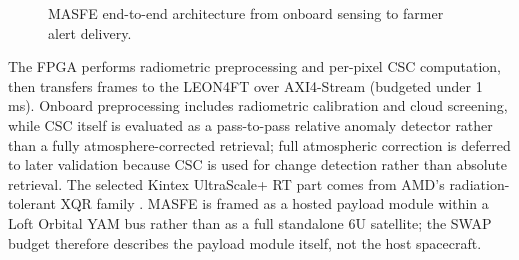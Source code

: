 \documentclass[11pt,letterpaper]{article}
\begin{document}
\begin{figure}[!htbp]
\centering
{}
\caption{MASFE end-to-end architecture from onboard sensing to farmer alert delivery.}
\label{fig:architecture}
\end{figure}

The FPGA performs radiometric preprocessing and per-pixel CSC computation, then transfers frames to the LEON4FT over AXI4-Stream (budgeted under 1 ms). Onboard preprocessing includes radiometric calibration and cloud screening, while CSC itself is evaluated as a pass-to-pass relative anomaly detector rather than a fully atmosphere-corrected retrieval; full atmospheric correction is deferred to later validation because CSC is used for change detection rather than absolute retrieval. The selected Kintex UltraScale+ RT part comes from AMD's radiation-tolerant XQR family \cite{amd-xqr}. MASFE is framed as a hosted payload module within a Loft Orbital YAM bus rather than as a full standalone 6U satellite; the SWAP budget therefore describes the payload module itself, not the host spacecraft.
\end{document}
